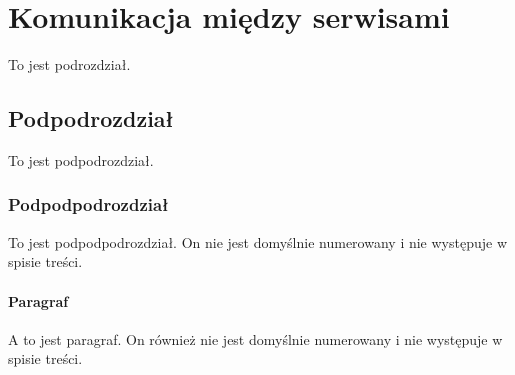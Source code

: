 \section{Komunikacja między serwisami}

To jest podrozdział.

\subsection{Podpodrozdział}

To jest podpodrozdział.

\subsubsection{Podpodpodrozdział}

To jest podpodpodrozdział. On nie jest domyślnie numerowany i nie występuje w spisie treści.

\paragraph{Paragraf}

A to jest paragraf. On również nie jest domyślnie numerowany i nie występuje w spisie treści.

